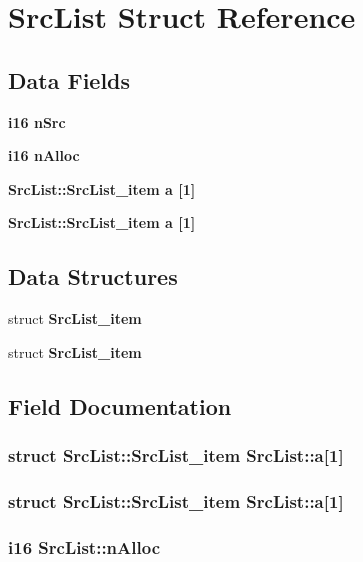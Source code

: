 \section{Src\-List Struct Reference}
\label{structSrcList}
\subsection*{Data Fields}
\begin{CompactItemize}
\item 
\bf{i16} \bf{n\-Src}
\item 
\bf{i16} \bf{n\-Alloc}
\item 
\bf{Src\-List::Src\-List\_\-item} \bf{a} [1]
\item 
\bf{Src\-List::Src\-List\_\-item} \bf{a} [1]
\end{CompactItemize}
\subsection*{Data Structures}
\begin{CompactItemize}
\item 
struct \bf{Src\-List\_\-item}
\item 
struct \bf{Src\-List\_\-item}
\end{CompactItemize}


\subsection{Field Documentation}
\subsubsection{\setlength{\rightskip}{0pt plus 5cm}struct \bf{Src\-List::Src\-List\_\-item}  \bf{Src\-List::a}[1]}\label{structSrcList_bd7fb2000e2bf3012f4dfceffca69068}


\subsubsection{\setlength{\rightskip}{0pt plus 5cm}struct \bf{Src\-List::Src\-List\_\-item}  \bf{Src\-List::a}[1]}\label{structSrcList_bd7fb2000e2bf3012f4dfceffca69068}


\subsubsection{\setlength{\rightskip}{0pt plus 5cm}\bf{i16} \bf{Src\-List::n\-Alloc}}\label{structSrcList_255a2b77efa05793a4395f8ed478171d}



